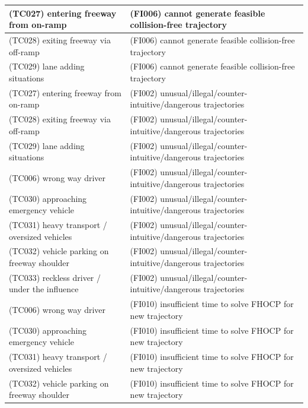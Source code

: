 \begin{longtable}{|p{8cm}|p{8cm}|}
\cellcolor{cYellow}(TC027) entering freeway from on-ramp& \cellcolor{cBlue}(FI006) cannot generate feasible collision-free trajectory\\\hline
\cellcolor{cYellow}(TC028) exiting freeway via off-ramp& \cellcolor{cBlue}(FI006) cannot generate feasible collision-free trajectory\\\hline
\cellcolor{cYellow}(TC029) lane adding situations& \cellcolor{cBlue}(FI006) cannot generate feasible collision-free trajectory\\\hline
\cellcolor{cYellow}(TC027) entering freeway from on-ramp& \cellcolor{cBlue}(FI002) unusual/illegal/counter-intuitive/dangerous trajectories\\\hline
\cellcolor{cYellow}(TC028) exiting freeway via off-ramp& \cellcolor{cBlue}(FI002) unusual/illegal/counter-intuitive/dangerous trajectories\\\hline
\cellcolor{cYellow}(TC029) lane adding situations& \cellcolor{cBlue}(FI002) unusual/illegal/counter-intuitive/dangerous trajectories\\\hline
\cellcolor{cGreen}(TC006) wrong way driver& \cellcolor{cBlue}(FI002) unusual/illegal/counter-intuitive/dangerous trajectories\\\hline
\cellcolor{cGreen}(TC030) approaching emergency vehicle& \cellcolor{cBlue}(FI002) unusual/illegal/counter-intuitive/dangerous trajectories\\\hline
\cellcolor{cGreen}(TC031) heavy transport / oversized vehicles& \cellcolor{cBlue}(FI002) unusual/illegal/counter-intuitive/dangerous trajectories\\\hline
\cellcolor{cGreen}(TC032) vehicle parking on freeway shoulder& \cellcolor{cBlue}(FI002) unusual/illegal/counter-intuitive/dangerous trajectories\\\hline
\cellcolor{cGreen}(TC033) reckless driver / under the influence& \cellcolor{cBlue}(FI002) unusual/illegal/counter-intuitive/dangerous trajectories\\\hline
\cellcolor{cGreen}(TC006) wrong way driver& \cellcolor{cBlue}(FI010) insufficient time to solve FHOCP for new trajectory\\\hline
\cellcolor{cGreen}(TC030) approaching emergency vehicle& \cellcolor{cBlue}(FI010) insufficient time to solve FHOCP for new trajectory\\\hline
\cellcolor{cGreen}(TC031) heavy transport / oversized vehicles& \cellcolor{cBlue}(FI010) insufficient time to solve FHOCP for new trajectory\\\hline
\cellcolor{cGreen}(TC032) vehicle parking on freeway shoulder& \cellcolor{cBlue}(FI010) insufficient time to solve FHOCP for new trajectory\\\hline

\end{longtable}
